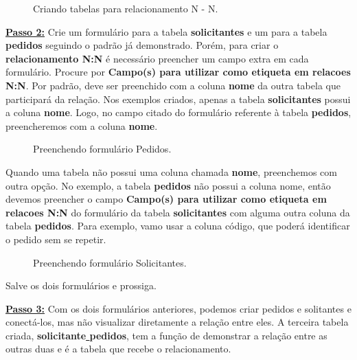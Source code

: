 \documentclass[9pt]{report}
\begin{document}
{       \begin{figure}[H]
        \caption{Criando tabelas para relacionamento N - N.}
        \label{fig:tabelasNN}
       \end{figure}

       \underline{\textbf{Passo 2:}} Crie um formulário para a tabela
       \textbf{solicitantes} e um para a tabela \textbf{pedidos}
       seguindo o padrão já demonstrado. Porém, para criar o
       \textbf{relacionamento N:N} é necessário preencher um campo
       extra em cada formulário. Procure por
       \textbf{Campo(s) para utilizar como etiqueta em relacoes N:N}.
       Por padrão, deve ser preenchido com a coluna \textbf{nome} da
       outra tabela que participará da relação. Nos exemplos criados,
       apenas a tabela \textbf{solicitantes} possui a coluna
       \textbf{nome}. Logo, no campo citado do formulário referente à
       tabela \textbf{pedidos}, preencheremos com a coluna
       \textbf{nome}.
       
       \begin{figure}[H]
        \caption{Preenchendo formulário Pedidos.}
        \label{fig:formpedidosNN}
       \end{figure}

       Quando uma tabela não possui uma coluna chamada \textbf{nome},
       preenchemos com outra opção. No exemplo, a tabela
       \textbf{pedidos} não possui a coluna nome, então devemos
       preencher o campo
       \textbf{Campo(s) para utilizar como etiqueta em relacoes N:N}
       do formulário da tabela \textbf{solicitantes} com alguma outra
       coluna da tabela \textbf{pedidos}. Para exemplo, vamo usar a
       coluna código, que poderá identificar o pedido sem se repetir.

       \begin{figure}[H]
        \caption{Preenchendo formulário Solicitantes.}
        \label{fig:formsolicitNN}
       \end{figure}

       Salve os dois formulários e prossiga.

       \underline{\textbf{Passo 3:}} Com os dois formulários
       anteriores, podemos criar pedidos e solitantes e conectá-los,
       mas não visualizar diretamente a relação entre eles. A
       terceira tabela criada,
       \textbf{solicitante\underline{ }pedidos}, tem a função de
       demonstrar a relação entre as outras duas e é a tabela que
       recebe o relacionamento.

}
\end{document}
